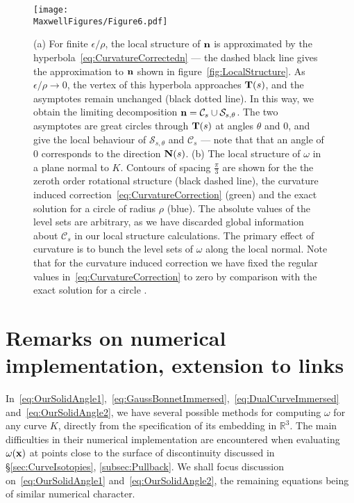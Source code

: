     \begin{figure}[htbp]
        \begin{centering}
            \texttt{[image: \\MaxwellFigures/Figure6.pdf]}
            \caption[Transverse solid angle structure.]{(a) For finite $\epsilon/\rho$, the local structure of $\bf n$ is approximated by the hyperbola~\eqref{eq:CurvatureCorrectedn} --- the dashed black line gives the approximation to $\bf n$ shown in figure~\ref{fig:LocalStructure}. As $\epsilon /\rho \rightarrow 0$, the vertex of this hyperbola approaches ${\bf T}(s)$, and the asymptotes remain unchanged (black dotted line). In this way, we obtain the limiting decomposition ${\bf n} = \mathcal{C}_s \cup \mathcal{S}_{s,\theta}$. The two asymptotes are great circles through ${\bf T}(s)$ at angles $\theta$ and $0$, and give the local behaviour of $\mathcal{S}_{s,\theta}$ and $\mathcal{C}_s$ --- note that that an angle of $0$ corresponds to the direction ${\bf N}(s)$. (b) The local structure of $\omega$ in a plane normal to $K$. Contours of spacing $\frac{\pi}{3}$ are shown for the the zeroth order rotational structure (black dashed line), the curvature induced correction~\eqref{eq:CurvatureCorrection} (green) and the exact solution for a circle of radius $\rho$ (blue). The absolute values of the level sets are arbitrary, as we have discarded global information about $\mathcal{C}_s$ in our local structure calculations. The primary effect of curvature is to bunch the level sets of $\omega$ along the local normal. Note that for the curvature induced correction we have fixed the regular values in~\eqref{eq:CurvatureCorrection} to zero by comparison with the exact solution for a circle \citep{Saffman1992}.}
            \label{fig:CurvatureCorrections}
        \end{centering}
    \end{figure}

    \section{Remarks on numerical implementation, extension to links}
    \label{sec:NumericalImplementation}

    In~\eqref{eq:OurSolidAngle1},~\eqref{eq:GaussBonnetImmersed},~\eqref{eq:DualCurveImmersed} and~\eqref{eq:OurSolidAngle2}, we have several possible methods for computing $\omega$ for any curve $K$, directly from the specification of its embedding in $\mathbb{R}^3$. The main difficulties in their numerical implementation are encountered when evaluating $\omega(\bf x)$ at points close to the surface of discontinuity discussed in \S\ref{sec:CurveIsotopies}, \ref{subsec:Pullback}. We shall focus discussion on~\eqref{eq:OurSolidAngle1} and~\eqref{eq:OurSolidAngle2}, the remaining equations being of similar numerical character.

